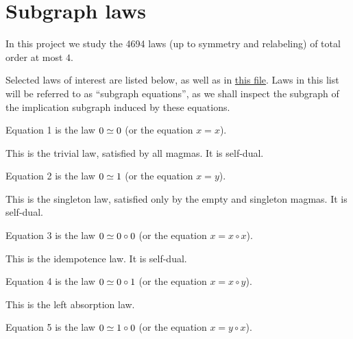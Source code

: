 \chapter{Subgraph laws}\label{subgraph-eq}

In this project we study the 4694 laws (up to symmetry and relabeling) of total order at most $4$.

Selected laws of interest are listed below, as well as in \href{https://github.com/teorth/equational_theories/blob/main/equational_theories/Equations.lean}{this file}.  Laws in this list will be referred to as ``subgraph equations'', as we shall inspect the subgraph of the implication subgraph induced by these equations.

\begin{definition}[Equation 1]\label{eq1}\leanok{}  Equation 1 is the law $0 \simeq 0$ (or the equation $x=x$).
\end{definition}

This is the trivial law, satisfied by all magmas. It is self-dual.


\begin{definition}[Equation 2]\label{eq2}\leanok{}  Equation 2 is the law $0 \simeq 1$ (or the equation $x=y$).
\end{definition}

This is the singleton law, satisfied only by the empty and singleton magmas.  It is self-dual.

\begin{definition}[Equation 3]\label{eq3}\leanok{}  Equation 3 is the law $0 \simeq 0 \circ 0$ (or the equation $x = x \circ x$).
\end{definition}

This is the idempotence law.  It is self-dual.

\begin{definition}[Equation 4]\label{eq4}\leanok{}  Equation 4 is the law $0 \simeq 0 \circ 1$ (or the equation $x = x \circ y$).
\end{definition}

This is the left absorption law.

\begin{definition}[Equation 5]\label{eq5}\leanok{}  Equation 5 is the law $0 \simeq 1 \circ 0$ (or the equation $x = y \circ x$).
\end{definition}

